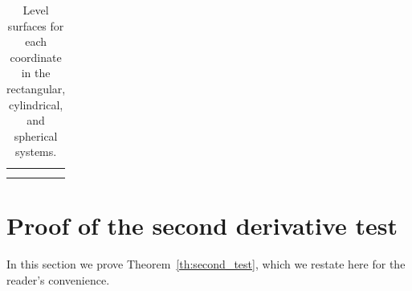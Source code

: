 \documentclass{watsonbook}
\begin{document}
  \begin{table}[h!]
    \centering
    \begin{tabular}{M{4.2cm}|M{4.2cm}|M{4.2cm}}
      \usebox{\xconstantfig} & \usebox{\yconstantfig} & \usebox{\zconstantfig}  \\ \hline
      \usebox{\rconstantfig} & \usebox{\thetaconstantfig}  & \usebox{\zconstantfig}  \\ \hline
      \usebox{\rhoconstantfig} & \usebox{\thetaconstantfig}  & \usebox{\phiconstantfig}  \\ \hline
    \end{tabular}
    \caption{Level surfaces for each coordinate
      in the rectangular, cylindrical, and spherical
      systems. \label{table:coordinateslices}}
  \end{table}

  \newpage

  \section{Proof of the second derivative test} \label{sec:proof_sdt}

  In this section we prove Theorem~\ref{th:second_test}, which we
  restate here for the reader's convenience.

  \begin{theo}{}{}
    \secondderivativetest
  \end{theo}
  
\end{document}
